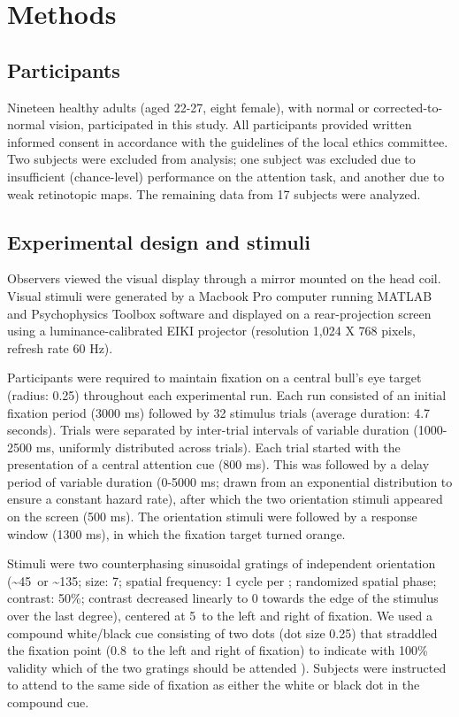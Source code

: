 \section{Methods}
\subsection{Participants}
Nineteen healthy adults (aged 22-27, eight female), with normal or corrected-to-normal vision, participated in this study. All participants provided written informed consent in accordance with the guidelines of the local ethics committee. Two subjects were excluded from analysis; one subject was excluded due to insufficient (chance-level) performance on the attention task, and another due to weak retinotopic maps. The remaining data from 17 subjects were analyzed.

\subsection{Experimental design and stimuli}
Observers viewed the visual display through a mirror mounted on the head coil. Visual stimuli were generated by a Macbook Pro computer running MATLAB and Psychophysics Toolbox software \cite{Brainard1997,Pelli1997} and displayed on a rear-projection screen using a luminance-calibrated EIKI projector (resolution 1,024 X 768 pixels, refresh rate 60 Hz).

Participants were required to maintain fixation on a central bull's eye target (radius: 0.25\textdegree) throughout each experimental run. Each run consisted of an initial fixation period (3000 ms) followed by 32 stimulus trials (average duration: 4.7 seconds). Trials were separated by inter-trial intervals of variable duration (1000-2500 ms, uniformly distributed across trials). Each trial started with the presentation of a central attention cue (800 ms). This was followed by a delay period of variable duration (0-5000 ms; drawn from an exponential distribution to ensure a constant hazard rate), after which the two orientation stimuli appeared on the screen (500 ms). The orientation stimuli were followed by a response window (1300 ms), in which the fixation target turned orange.

Stimuli were two counterphasing sinusoidal gratings of independent orientation (\textasciitilde 45\textdegree~or \textasciitilde 135\textdegree; size: 7\textdegree; spatial frequency: 1 cycle per \textdegree; randomized spatial phase; contrast: 50\%; contrast decreased linearly to 0 towards the edge of the stimulus over the last degree), centered at 5\textdegree~to the left and right of fixation. We used a compound white/black cue consisting of two dots (dot size 0.25\textdegree) that straddled the fixation point (0.8\textdegree~to the left and right of fixation) to indicate with 100\% validity which of the two gratings should be attended \cite{Jehee2011}). Subjects were instructed to attend to the same side of fixation as either the white or black dot in the compound cue.

